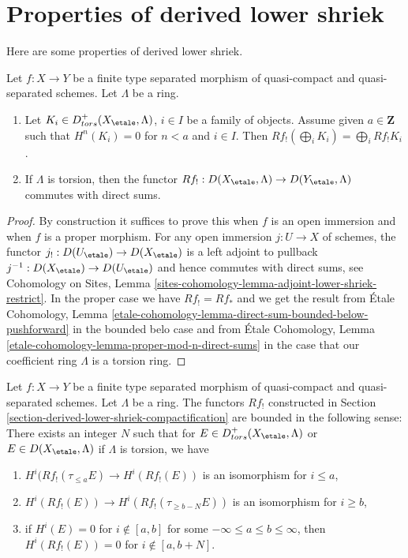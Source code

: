 \section{Properties of derived lower shriek}
\label{section-derived-lower-shriek-properties}

\noindent
Here are some properties of derived lower shriek.

\begin{lemma}
\label{lemma-derived-lower-shriek-commute-direct-sums}
Let $f : X \to Y$ be a finite type separated morphism of quasi-compact
and quasi-separated schemes. Let $\Lambda$ be a ring.
\begin{enumerate}
\item Let $K_i \in D^+_{tors}(X_\etale, \Lambda)$, $i \in I$ be a family
of objects. Assume given $a \in \mathbf{Z}$ such that
$H^n(K_i) = 0$ for $n < a$ and $i \in I$. Then $Rf_!(\bigoplus_i K_i) =
\bigoplus_i Rf_!K_i$.
\item If $\Lambda$ is torsion, then the functor
$Rf_! : D(X_\etale, \Lambda) \to D(Y_\etale, \Lambda)$
commutes with direct sums.
\end{enumerate}
\end{lemma}

\begin{proof}
By construction it suffices to prove this when $f$ is an open immersion
and when $f$ is a proper morphism. For any open immersion $j : U \to X$
of schemes, the functor $j_! : D(U_\etale) \to D(X_\etale)$ is a left
adjoint to pullback $j^{-1} : D(X_\etale) \to D(U_\etale)$
and hence commutes with direct sums, see Cohomology on Sites, Lemma
\ref{sites-cohomology-lemma-adjoint-lower-shriek-restrict}.
In the proper case we have $Rf_! = Rf_*$ and we get the result from
\'Etale Cohomology, Lemma
\ref{etale-cohomology-lemma-direct-sum-bounded-below-pushforward}
in the bounded belo case and from
\'Etale Cohomology, Lemma \ref{etale-cohomology-lemma-proper-mod-n-direct-sums}
in the case that our coefficient ring $\Lambda$ is a torsion ring.
\end{proof}

\begin{lemma}
\label{lemma-derived-lower-shriek-bounded}
Let $f : X \to Y$ be a finite type separated morphism of quasi-compact
and quasi-separated schemes. Let $\Lambda$ be a ring. The functors $Rf_!$
constructed in Section \ref{section-derived-lower-shriek-compactification}
are bounded in the following sense: There exists an integer $N$ such that
for $E \in D^+_{tors}(X_\etale, \Lambda)$ or $E \in D(X_\etale, \Lambda)$
if $\Lambda$ is torsion, we have
\begin{enumerate}
\item $H^i(Rf_!(\tau_{\leq a}E) \to H^i(Rf_!(E))$ is an isomorphism
for $i \leq a$,
\item $H^i(Rf_!(E)) \to H^i(Rf_!(\tau_{\geq b - N}E))$ is an isomorphism
for $i \geq b$,
\item if $H^i(E) = 0$ for $i \not \in [a, b]$ for some
$-\infty \leq a \leq b \leq \infty$, then $H^i(Rf_!(E)) = 0$
for $i \not \in [a, b + N]$.
\end{enumerate}
\end{lemma}

